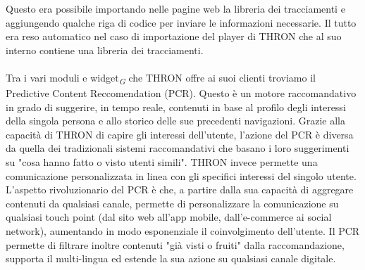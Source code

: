 \documentclass[a4paper, 12pt, twoside, openright]{book}
\newcommand{\gloss}[1]{#1\textsubscript{\textit{\tiny{G}}}}
\begin{document}
Questo era possibile importando nelle pagine web la libreria dei tracciamenti e aggiungendo qualche riga di codice per inviare le informazioni necessarie. Il tutto era reso automatico nel caso di importazione del player di THRON che al suo interno contiene una libreria dei tracciamenti.\\ \\
Tra i vari moduli e \gloss{widget} che THRON offre ai suoi clienti troviamo il Predictive Content Reccomendation (PCR). Questo è un motore raccomandativo in grado di suggerire, in tempo reale, contenuti in base al profilo degli interessi della singola persona e allo storico delle sue precedenti navigazioni. Grazie alla capacità di THRON di capire gli interessi dell'utente, l'azione del PCR è diversa da quella dei tradizionali sistemi raccomandativi che basano i loro suggerimenti su "cosa hanno fatto o visto utenti simili". THRON invece permette una comunicazione personalizzata in linea con gli specifici interessi del singolo utente. L'aspetto rivoluzionario del PCR è che, a partire dalla sua capacità di aggregare contenuti da qualsiasi canale, permette di personalizzare la comunicazione su qualsiasi touch point (dal sito web all'app mobile, dall'e-commerce ai social network), aumentando in modo esponenziale il coinvolgimento dell'utente. Il PCR permette di filtrare inoltre contenuti "già visti o fruiti" dalla raccomandazione, supporta il multi-lingua ed estende la sua azione su qualsiasi canale digitale.

\newpage{}
\end{document}
